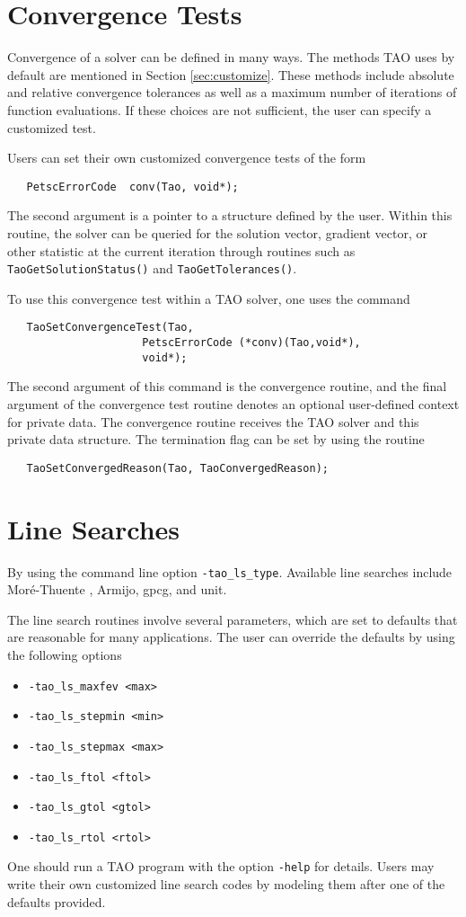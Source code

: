 \section{Convergence Tests}
\label{sec:Taoconvergence}

Convergence of a solver can be defined in many ways.
The methods TAO uses by default are mentioned in 
Section \ref{sec:customize}.
These methods include absolute and relative convergence tolerances as well
as a maximum number of iterations of function evaluations.
If these choices are not sufficient, 
the user can specify a customized test. 

Users can set their own customized convergence tests of the form
\begin{verbatim}
   PetscErrorCode  conv(Tao, void*);
\end{verbatim}
\noindent
The second argument is a pointer to a structure defined by the user.
Within this routine, the solver
can be queried for the solution vector, gradient vector,
or other statistic at the current iteration through routines such as
{\tt TaoGetSolutionStatus()} and  {\tt TaoGetTolerances()}.

To use this convergence test within a TAO solver, one uses
the command 
\begin{verbatim}
   TaoSetConvergenceTest(Tao,
                     PetscErrorCode (*conv)(Tao,void*),
                     void*);
\end{verbatim}
\noindent
The second argument of this command is the convergence routine, and the
final argument of the convergence test routine denotes an optional 
user-defined context for private data.  
The convergence routine receives the TAO solver and this private data
structure. 
The termination flag can be set by using the routine
\begin{verbatim}
   TaoSetConvergedReason(Tao, TaoConvergedReason);
\end{verbatim}
\noindent



\section{Line Searches} 
\label{sec:TaoLineSearch}

By using the command line option  {\tt -tao\_ls\_type}.  
Available line searches 
include Mor\'{e}-Thuente \cite{more:92}, Armijo, gpcg, and unit.

The line search routines involve several parameters, which are set
to defaults that are reasonable for many applications.  The user
can override the defaults by using the following options
\begin{itemize}
\item {\tt -tao\_ls\_maxfev <max>}
\item {\tt -tao\_ls\_stepmin <min>}
\item {\tt -tao\_ls\_stepmax <max>}
\item {\tt -tao\_ls\_ftol <ftol>}
\item {\tt -tao\_ls\_gtol <gtol>}
\item {\tt -tao\_ls\_rtol <rtol>}
\end{itemize}

One should run a TAO program with the option 
{\tt -help}
for details.  Users may write their own customized line search codes
by modeling them after one of the defaults provided.

